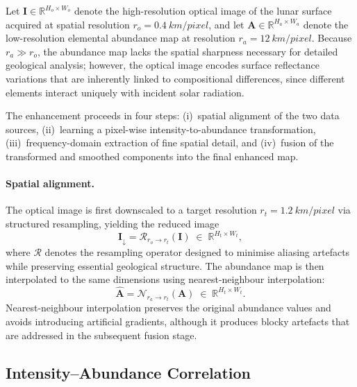 \documentclass[journal,lettersize]{IEEEtran}
\begin{document}
Let $\mathbf{I} \in \mathbb{R}^{H_o \times W_o}$ denote the
high-resolution optical image of the lunar surface acquired at spatial
resolution $r_o = \SI{0.4}{km/pixel}$, and let
$\mathbf{A} \in \mathbb{R}^{H_a \times W_a}$ denote the low-resolution
elemental abundance map at resolution $r_a = \SI{12}{km/pixel}$.
Because $r_a \gg r_o$, the abundance map lacks the spatial sharpness
necessary for detailed geological analysis; however, the optical image
encodes surface reflectance variations that are inherently linked to
compositional differences, since different elements interact uniquely
with incident solar radiation.

The enhancement proceeds in four steps: (i)~spatial alignment of the
two data sources, (ii)~learning a pixel-wise intensity-to-abundance
transformation, (iii)~frequency-domain extraction of fine spatial
detail, and (iv)~fusion of the transformed and smoothed components into
the final enhanced map.

\paragraph{Spatial alignment.}
The optical image is first downscaled to a target resolution
$r_t = \SI{1.2}{km/pixel}$ via structured resampling, yielding the
reduced image
\begin{equation}\label{eq:downscale}
  \mathbf{I}_{\downarrow} = \mathcal{R}_{r_o \to r_t}(\mathbf{I})
  \;\in\; \mathbb{R}^{H_t \times W_t},
\end{equation}
where $\mathcal{R}$ denotes the resampling operator designed to minimise
aliasing artefacts while preserving essential geological structure.  The
abundance map is then interpolated to the same dimensions using
nearest-neighbour interpolation:
\begin{equation}\label{eq:interp}
  \hat{\mathbf{A}} = \mathcal{N}_{r_a \to r_t}(\mathbf{A})
  \;\in\; \mathbb{R}^{H_t \times W_t}.
\end{equation}
Nearest-neighbour interpolation preserves the original abundance values
and avoids introducing artificial gradients, although it produces
blocky artefacts that are addressed in the subsequent fusion stage.

\subsection{Intensity--Abundance Correlation}\label{sec:sr_correlation}
\end{document}
